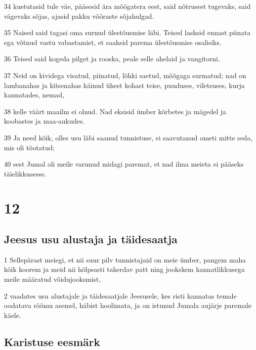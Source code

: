 \par 34 kustutasid tule väe, pääsesid ära mõõgatera eest, said nõtrusest tugevaks, said vägevaks sõjas, ajasid pakku võõraste sõjahulgad.
\par 35 Naised said tagasi oma surnud ülestõusmise läbi. Teised lasksid ennast piinata ega võtnud vastu vabastamist, et saaksid parema ülestõusmise osalisiks.
\par 36 Teised said kogeda pilget ja rooska, peale selle ahelaid ja vangitorni.
\par 37 Neid on kividega visatud, piinatud, lõhki saetud, mõõgaga surmatud; nad on lambanahas ja kitsenahas käinud ühest kohast teise, puuduses, viletsuses, kurja kannatades, nemad,
\par 38 kelle väärt maailm ei olnud. Nad eksisid ümber kõrbetes ja mägedel ja koobastes ja maa-aukudes.
\par 39 Ja need kõik, olles usu läbi saanud tunnistuse, ei saavutanud ometi mitte seda, mis oli tõotatud;
\par 40 sest Jumal oli meile varunud midagi paremat, et nad ilma meieta ei pääseks täielikkusesse.


\chapter{12}

\section*{Jeesus usu alustaja ja täidesaatja}

\par 1 Sellepärast meiegi, et nii suur pilv tunnistajaid on meie ümber, pangem maha kõik koorem ja meid nii hõlpsasti takerdav patt ning jookskem kannatlikkusega meile määratud võidujooksmist,
\par 2 vaadates usu alustajale ja täidesaatjale Jeesusele, kes risti kannatas temale oodatava rõõmu asemel, häbist hoolimata, ja on istunud Jumala aujärje paremale käele.

\section*{Karistuse eesmärk}


